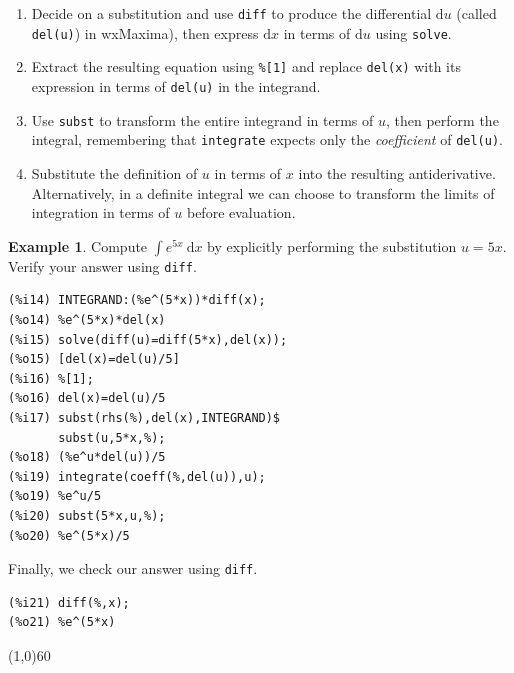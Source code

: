 \documentclass[10.5pt,twoside]{report}
\theoremstyle{definition}
\newtheorem{exmp}{Example}[section]
\begin{document}
\begin{enumerate}

\item Decide on a substitution and use \verb|diff| to produce the differential $\mathrm{d}u$ (called \verb|del(u)|) in wxMaxima), then express $\mathrm{d}x$ in terms of $\mathrm{d}u$ using \verb|solve|. 

\item Extract the resulting equation  using \verb|%[1]| and replace \verb|del(x)| with its expression in terms of \verb|del(u)| in the integrand.

\item Use \verb|subst| to transform the entire integrand in terms of $u$, then perform the integral, remembering that \verb|integrate| expects only the \textit{coefficient} of \verb|del(u)|.

\item Substitute the definition of $u$ in terms of $x$ into the resulting antiderivative.  Alternatively, in a  definite integral we can choose to transform the limits of integration in terms of $u$ before evaluation.

\end{enumerate}
\pagebreak

\begin{exmp} Compute $\displaystyle \int e^{5x} \ \mathrm{d}x$ by explicitly performing the substitution $u=5x$.  Verify your answer using \verb|diff|.\\


\begin{verbatim}
(%i14) INTEGRAND:(%e^(5*x))*diff(x);
(%o14) %e^(5*x)*del(x)
(%i15) solve(diff(u)=diff(5*x),del(x));
(%o15) [del(x)=del(u)/5]
(%i16) %[1];
(%o16) del(x)=del(u)/5
(%i17) subst(rhs(%),del(x),INTEGRAND)$
       subst(u,5*x,%);
(%o18) (%e^u*del(u))/5
(%i19) integrate(coeff(%,del(u)),u);
(%o19) %e^u/5
(%i20) subst(5*x,u,%);
(%o20) %e^(5*x)/5
\end{verbatim}

Finally, we check our answer using \verb|diff|.

\begin{verbatim}
(%i21) diff(%,x);
(%o21) %e^(5*x)
\end{verbatim}

\end{exmp}

\line(1,0){60}
\linethickness{0.5mm}
\end{document}
